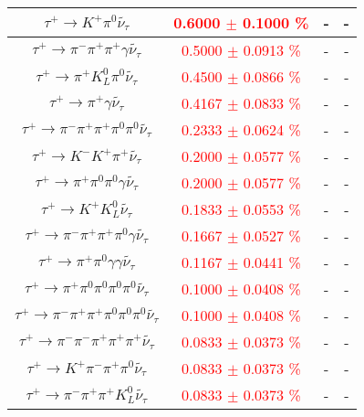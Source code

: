 {\begin{longtable}{|c|c|c|c|}
\hline 
 $\tau^{+} \rightarrow K^{+} \pi^{0} \widetilde{\nu_{\tau}} $ & \textcolor{red}{ 0.6000  $\pm$   0.1000 \% }&  - & - \\ 
\hline 
 $\tau^{+} \rightarrow \pi^{-} \pi^{+} \pi^{+} \gamma \widetilde{\nu_{\tau}} $ & \textcolor{red}{ 0.5000  $\pm$   0.0913 \% }&  - & - \\ 
\hline 
 $\tau^{+} \rightarrow \pi^{+} K_{L}^{0} \pi^{0} \widetilde{\nu_{\tau}} $ & \textcolor{red}{ 0.4500  $\pm$   0.0866 \% }&  - & - \\ 
\hline 
 $\tau^{+} \rightarrow \pi^{+} \gamma \widetilde{\nu_{\tau}} $ & \textcolor{red}{ 0.4167  $\pm$   0.0833 \% }&  - & - \\ 
\hline 
 $\tau^{+} \rightarrow \pi^{-} \pi^{+} \pi^{+} \pi^{0} \pi^{0} \widetilde{\nu_{\tau}} $ & \textcolor{red}{ 0.2333  $\pm$   0.0624 \% }&  - & - \\ 
\hline 
 $\tau^{+} \rightarrow K^{-} K^{+} \pi^{+} \widetilde{\nu_{\tau}} $ & \textcolor{red}{ 0.2000  $\pm$   0.0577 \% }&  - & - \\ 
\hline 
 $\tau^{+} \rightarrow \pi^{+} \pi^{0} \pi^{0} \gamma \widetilde{\nu_{\tau}} $ & \textcolor{red}{ 0.2000  $\pm$   0.0577 \% }&  - & - \\ 
\hline 
 $\tau^{+} \rightarrow K^{+} K_{L}^{0} \widetilde{\nu_{\tau}} $ & \textcolor{red}{ 0.1833  $\pm$   0.0553 \% }&  - & - \\ 
\hline 
 $\tau^{+} \rightarrow \pi^{-} \pi^{+} \pi^{+} \pi^{0} \gamma \widetilde{\nu_{\tau}} $ & \textcolor{red}{ 0.1667  $\pm$   0.0527 \% }&  - & - \\ 
\hline 
 $\tau^{+} \rightarrow \pi^{+} \pi^{0} \gamma \gamma \widetilde{\nu_{\tau}} $ & \textcolor{red}{ 0.1167  $\pm$   0.0441 \% }&  - & - \\ 
\hline 
 $\tau^{+} \rightarrow \pi^{+} \pi^{0} \pi^{0} \pi^{0} \pi^{0} \widetilde{\nu_{\tau}} $ & \textcolor{red}{ 0.1000  $\pm$   0.0408 \% }&  - & - \\ 
\hline 
 $\tau^{+} \rightarrow \pi^{-} \pi^{+} \pi^{+} \pi^{0} \pi^{0} \pi^{0} \widetilde{\nu_{\tau}} $ & \textcolor{red}{ 0.1000  $\pm$   0.0408 \% }&  - & - \\ 
\hline 
 $\tau^{+} \rightarrow \pi^{-} \pi^{-} \pi^{+} \pi^{+} \pi^{+} \widetilde{\nu_{\tau}} $ & \textcolor{red}{ 0.0833  $\pm$   0.0373 \% }&  - & - \\ 
\hline 
 $\tau^{+} \rightarrow K^{+} \pi^{-} \pi^{+} \pi^{0} \widetilde{\nu_{\tau}} $ & \textcolor{red}{ 0.0833  $\pm$   0.0373 \% }&  - & - \\ 
\hline 
 $\tau^{+} \rightarrow \pi^{-} \pi^{+} \pi^{+} K_{L}^{0} \widetilde{\nu_{\tau}} $ & \textcolor{red}{ 0.0833  $\pm$   0.0373 \% }&  - & - \\ 

\end{longtable}}

